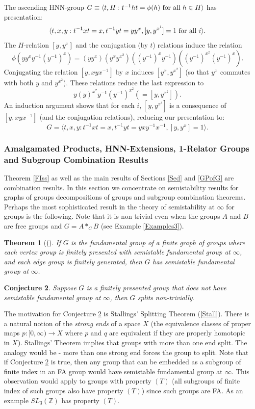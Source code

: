 \documentclass[12pt]{article}
\newtheorem{theorem}{Theorem}[subsection]
\newtheorem{conjecture}[theorem]{Conjecture}
\begin{document}
The ascending HNN-group $G\equiv \langle t, H:t^{-1}ht=\phi(h) \hbox{ for all } h\in H\rangle$ has presentation:
$$\langle t,x,y:t^{-1}xt=x, t^{-1}yt=yy^{x}, [y,y^{x^i}]=1 \hbox{ for all }i\rangle.$$
The $H$-relation $[y, y^{x}]$ and the conjugation (by $t$) relations induce the relation  
$$\phi(yy^xy^{-1}(y^{-1})^x)=(yy^x)(y^xy^{x^2})((y^{-1})^xy^{-1})((y^{-1})^{x^2}(y^{-1})^x).$$
Conjugating the relation $[y, xyx^{-1}]$ by $x$ induces $[y^x,y^{x^2}]$ (so that $y^x$ commutes with both $y$ and $y^{x^2}$). These relations reduce the last expression to 
$$y(y)^{x^2}y^{-1}(y^{-1})^{x^2} (=[y,y^{x^2}]).$$
An induction argument shows that for each $i$, $[y,y^{x^i}]$ is a consequence of $[y, xyx^{-1}]$ (and the conjugation relations), reducing our presentation to:
$$G=\langle t,x,y:t^{-1}xt=x, t^{-1}yt=yxy^{-1}x^{-1}, [y,y^{x}]=1\rangle.$$



\subsubsection{Amalgamated Products, HNN-Extensions, 1-Relator Groups and Subgroup Combination Results} \label{Comb1R}

Theorem \ref{FIss} as well as the main results of Sections \ref{Sed} and \ref{GPofG} are combination results. In this section we concentrate on semistability results for graphs of groups decompositions of groups and subgroup combination theorems. 
Perhaps the most sophisticated result in the theory of semistability at $\infty$ for groups is the following. Note that it is non-trivial even when the groups $A$ and $B$ are free groups and $G=A\ast_CB$ (see Example \ref{Examples3}).

\begin{theorem} [(\cite{MT1992}] \label{MTComb}  
If $G$ is the fundamental group of a finite graph of groups where each vertex group is finitely presented with semistable fundamental group at $\infty$, and each edge group is finitely generated, then $G$ has semistable fundamental group at $\infty$. 
\end{theorem}

\begin{conjecture}\label{NSSsplit} 
Suppose $G$ is a finitely presented group that does not have semistable fundamental group at $\infty$, then $G$ splits non-trivially.
\end{conjecture}

The motivation for Conjecture \ref{NSSsplit} is Stallings' Splitting Theorem (\ref{Stall}). There is a natural notion of the {\it strong ends} of a space $X$ (the equivalence classes of proper maps $p:[0,\infty)\to X$ where $p$ and $q$ are equivalent if they are properly homotopic in $X$). Stallings' Theorem implies that groups with more than one end split. The analogy would be - more than one strong end forces the group to split. Note that if Conjecture \ref{NSSsplit} is true, then any group that can be embedded as a subgroup of finite index in an FA group would have semistable fundamental group at $\infty$. This observation would apply to groups with property $(T)$ (all subgroups of finite index of such groups also have property $(T)$) since such groups are FA. As an example $SL_3(\mathbb Z)$ has property $(T)$.
\end{document}
